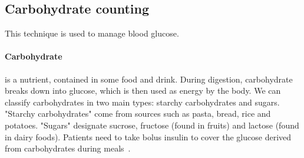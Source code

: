\subsection{Carbohydrate counting} 
\label{sec:ccount}
This technique is used to manage blood glucose. \paragraph{Carbohydrate} is a nutrient, contained in some food and drink. During digestion, carbohydrate breaks down into glucose, which is then used as energy by the body. 
We can classify carbohydrates in two main types: starchy carbohydrates and sugars. 
"Starchy carbohydrates" come from sources such as pasta, bread, rice and potatoes. "Sugars" designate sucrose, fructose (found in fruits) and lactose (found in dairy foods). Patients need to take bolus insulin to cover the glucose derived from carbohydrates during meals~\cite{carbcountPdf}. 
